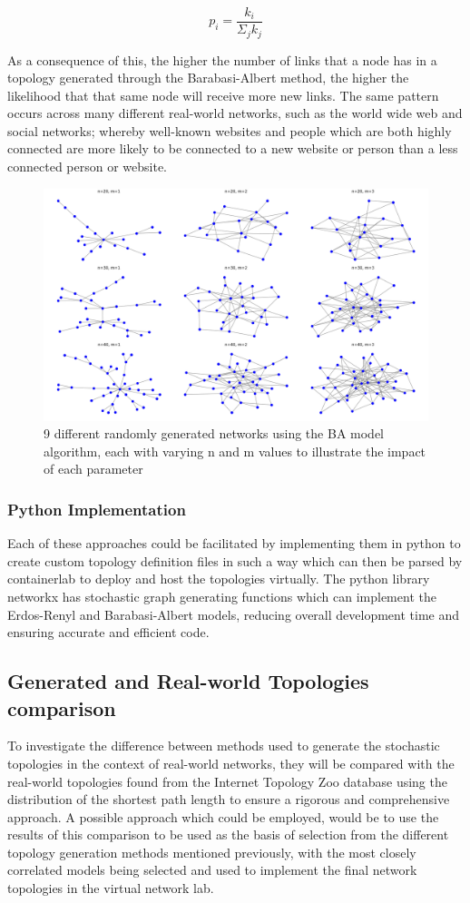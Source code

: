 \begin{equation} \label{eq:3}
    p_i = \frac{k_i}{\Sigma_jk_j}
\end{equation}

As a consequence of this, the higher the number of links that a node has in a topology generated through the Barabasi-Albert method, the higher the likelihood that that same node will receive more new links. The same pattern occurs across many different real-world networks, such as the world wide web and social networks; whereby well-known websites and people which are both highly connected are more likely to be connected to a new website or person than a less connected person or website.  

\begin{figure}
    \centering
    \includegraphics[width=0.75\linewidth]{images/BA_9.png}
    \caption{9 different randomly generated networks using the BA model algorithm, each with varying n and m values to illustrate the impact of each parameter}
    \label{fig:BA_9}
\end{figure}


\subsubsection{Python Implementation}
Each of these approaches could be facilitated by implementing them in python to create custom topology definition files in such a way which can then be parsed by containerlab to deploy and host the topologies virtually. 
The python library networkx \cite{networkX} has stochastic graph generating functions which can implement the Erdos-Renyl and Barabasi-Albert models, reducing overall development time and ensuring accurate and efficient code. 

\subsection{Generated and Real-world Topologies comparison}
To investigate the difference between methods used to generate the stochastic topologies in the context of real-world networks, they will be compared with the real-world topologies found from the Internet Topology Zoo database using the distribution of the shortest path length to ensure a rigorous and comprehensive approach. A possible approach which could be employed, would be to use the results of this comparison to be used as the basis of selection from the different topology generation methods mentioned previously, with the most closely correlated models  being selected and used to implement the final network topologies in the virtual network lab. 

